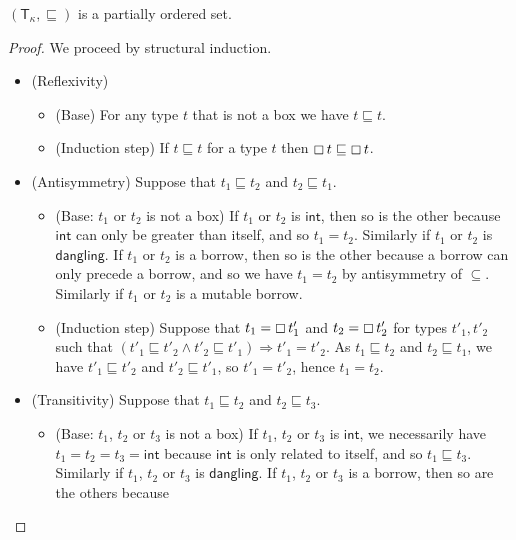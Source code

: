 \begin{lemma}
  \label{lemma:partial-order-types}
  $(\mathsf{T}_\kappa,\sqsubseteq)$ is a partially ordered set.
\end{lemma}
\begin{proof}
  We proceed by structural induction.
  \begin{itemize}
    \item (Reflexivity)
    \begin{itemize}
      \item (Base) For any type $t$ that is not a box we have
      $t\sqsubseteq t$.
      \item (Induction step) If $t\sqsubseteq t$ for a type $t$ then
      $\boxempty\,{t}\sqsubseteq \boxempty\,{t}$.
    \end{itemize}
    \item (Antisymmetry) Suppose that $t_1 \sqsubseteq t_2$ and
    $t_2 \sqsubseteq t_1$.
    \begin{itemize}
      \item (Base: $t_1$ or $t_2$ is not a box)
      If $t_1$ or $t_2$ is $\mathsf{int}$, then so is the other
      because $\mathsf{int}$ can only be greater than itself, and so $t_1 = t_2$.
      Similarly if $t_1$ or $t_2$ is $\mathsf{dangling}$.
      If $t_1$ or $t_2$ is a borrow, then so is the other because
      a borrow can only precede a borrow, and so we have $t_1 = t_2$
      by antisymmetry of $\subseteq$.
      Similarly if $t_1$ or $t_2$ is a mutable borrow.
      \item (Induction step) Suppose that $t_1=\boxempty\,{t'_1}$ and
      $t_2=\boxempty\,{t'_2}$ for types $t'_1,t'_2$ such that
      $(t'_1 \sqsubseteq t'_2 \land t'_2 \sqsubseteq t'_1) \Rightarrow t'_1 = t'_2$.
      As $t_1 \sqsubseteq t_2$ and $t_2 \sqsubseteq t_1$, we have
      $t'_1 \sqsubseteq t'_2$ and $t'_2 \sqsubseteq t'_1$, so
      $t'_1 = t'_2$, hence $t_1 = t_2$.
    \end{itemize}
    \item (Transitivity) Suppose that $t_1 \sqsubseteq t_2$ and $t_2 \sqsubseteq t_3$.
    \begin{itemize}
      \item (Base: $t_1$, $t_2$ or $t_3$ is not a box)
      If $t_1$, $t_2$ or $t_3$ is $\mathsf{int}$, we necessarily have
      $t_1=t_2=t_3=\mathsf{int}$ because $\mathsf{int}$ is only related to
      itself, and so $t_1\sqsubseteq t_3$. Similarly if
      $t_1$, $t_2$ or $t_3$ is $\mathsf{dangling}$.
      If $t_1$, $t_2$ or $t_3$ is a borrow, then so are the others because

\end{itemize}
\end{itemize}
\end{proof}
